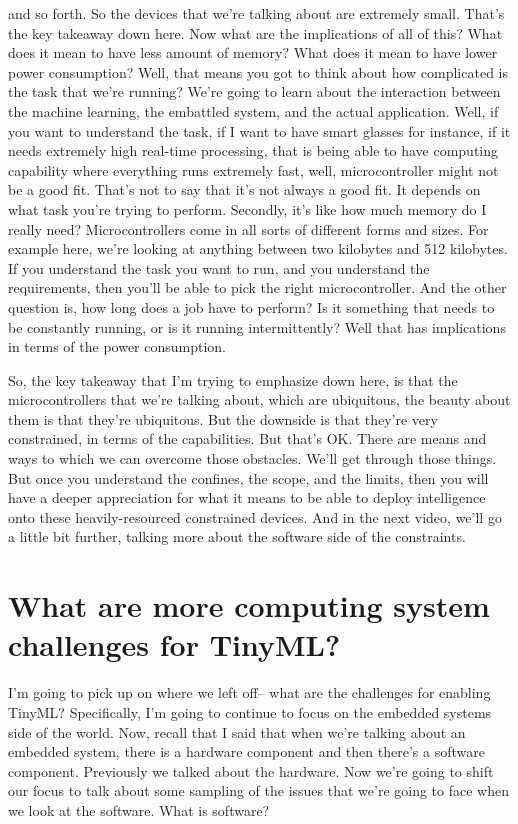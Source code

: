 and so forth.
So the devices that we're talking about are extremely small.
That's the key takeaway down here.
Now what are the implications of all of this?
What does it mean to have less amount of memory?
What does it mean to have lower power consumption?
Well, that means you got to think about how complicated is the task that we're running?
We're going to learn about the interaction between the machine learning, the embattled system, and the actual application.
Well, if you want to understand the task, if I want to have smart glasses for instance, if it needs extremely high real-time processing, that is being able to have computing capability where everything runs extremely fast, well, microcontroller might not be a good fit.
That's not to say that it's not always a good fit.
It depends on what task you're trying to perform.
Secondly, it's like how much memory do I really need?
Microcontrollers come in all sorts of different forms and sizes.
For example here, we're looking at anything between two kilobytes and 512 kilobytes.
If you understand the task you want to run, and you understand the requirements, then you'll be able to pick the right microcontroller.
And the other question is, how long does a job have to perform?
Is it something that needs to be constantly running, or is it running intermittently?
Well that has implications in terms of the power consumption.

So, the key takeaway that I'm trying to emphasize down here, is that the microcontrollers that we're talking about, which are ubiquitous, the beauty about them is that they're ubiquitous.
But the downside is that they're very constrained, in terms of the capabilities.
But that's OK.
There are means and ways to which we can overcome those obstacles.
We'll get through those things.
But once you understand the confines, the scope, and the limits, then you will have a deeper appreciation for what it means to be able to deploy intelligence onto these heavily-resourced constrained devices.
And in the next video, we'll go a little bit further, talking more about the software side of the constraints. 


\section{What are more computing system challenges for TinyML?}


I'm going to pick up on where we left off-- what are the challenges for enabling TinyML?
Specifically, I'm going to continue to focus on the embedded systems side of the world.
Now, recall that I said that when we're talking about an embedded system, there is a hardware component and then there's a software component.
Previously we talked about the hardware.
Now we're going to shift our focus to talk about some sampling of the issues that we're going to face when we look at the software.
What is software?

